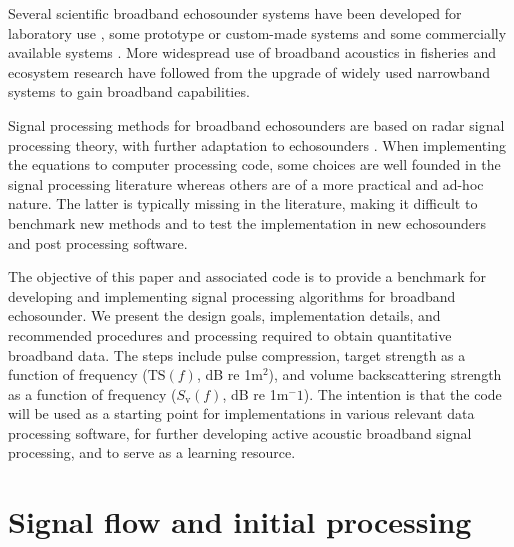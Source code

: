 \documentclass[preprint,12pt,TurnOnLineNumbers]{JASAnew}
\newcommand{\freqsym}{f}
\newcommand{\ts}{\textrm{TS}}
\newcommand{\sv}{S_{\textrm{v}}}
\begin{document}
Several scientific broadband echosounder systems have been developed for laboratory use \citep{Conti2003Wide-bandwidth, Forland2014Scattering, chu1992}, some prototype or custom-made systems \citep{Zakharia1989Wide-band, Zakharia1996Wideband, Simmonds1996Species, Foote2005Measuring, Imaizumi2009Detection, Briseno-Avena2015ZOOPS, Barr2002Target} and some commercially available systems \citep{Gordon1998FishMASS, Zedel2003Acoustic, Stanton2010New, ehrenbergFMSlideChirp2000, dennyBroadbandAcousticFish1998}. More widespread use of broadband acoustics in fisheries and ecosystem research have followed from the upgrade of widely used narrowband systems to gain broadband capabilities.

Signal processing methods for broadband echosounders \citep{stanton2008} are based on radar signal processing theory, with further adaptation to echosounders \citep{lavery2017,bassett_broadband_2018}. When implementing the equations to computer processing code, some choices are well founded in the signal processing literature whereas others are of a more practical and ad-hoc nature. The latter is typically missing in the literature, making it difficult to benchmark new methods and to test the implementation in new echosounders and post processing software. 

The objective of this paper and associated code is to provide a benchmark for developing and implementing signal processing algorithms for broadband echosounder. We present the design goals, implementation details, and recommended procedures and processing required to obtain quantitative broadband data. The steps include pulse compression, target strength as a function of frequency ($\ts(\freqsym)$, dB re 1m$^2$), and volume backscattering strength as a function of frequency ($\sv(\freqsym)$, dB re 1m$^-1$). The intention is that the code will be used as a starting point for implementations in various relevant data processing software, for further developing active acoustic broadband signal processing, and to serve as a learning resource. 

\section{Signal flow and initial processing}
\end{document}
